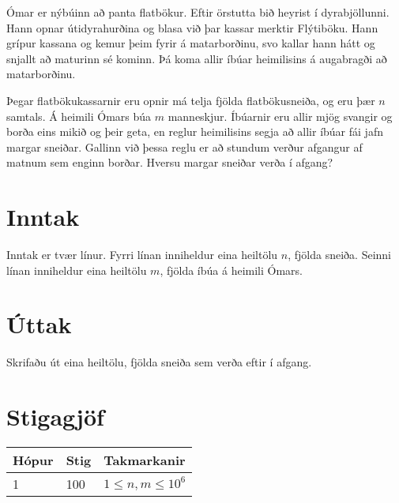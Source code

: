 
Ómar er nýbúinn að panta flatbökur.
Eftir örstutta bið heyrist í dyrabjöllunni.
Hann opnar útidyrahurðina og blasa við þar kassar merktir Flýtiböku.
Hann grípur kassana og kemur þeim fyrir á matarborðinu, svo kallar hann hátt og snjallt að maturinn sé kominn.
Þá koma allir íbúar heimilisins á augabragði að matarborðinu.

Þegar flatbökukassarnir eru opnir má telja fjölda flatbökusneiða, og eru þær $n$ samtals.
Á heimili Ómars búa $m$ manneskjur.
Íbúarnir eru allir mjög svangir og borða eins mikið og þeir geta, en reglur heimilisins segja að allir íbúar fái jafn margar sneiðar.
Gallinn við þessa reglu er að stundum verður afgangur af matnum sem enginn borðar.
Hversu margar sneiðar verða í afgang?

\section*{Inntak}
Inntak er tvær línur.
Fyrri línan inniheldur eina heiltölu $n$, fjölda sneiða.
Seinni línan inniheldur eina heiltölu $m$, fjölda íbúa á heimili Ómars.

\section*{Úttak}
Skrifaðu út eina heiltölu, fjölda sneiða sem verða eftir í afgang.

\section*{Stigagjöf}
\begin{tabular}{|l|l|l|}
\hline
Hópur & Stig & Takmarkanir \\ \hline
1     & 100   & $1 \leq n, m \leq 10^6$ \\ \hline
\end{tabular}


